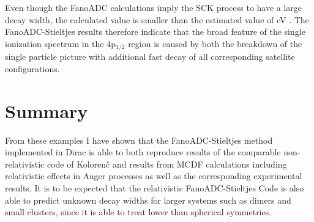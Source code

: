 Even though the FanoADC calculations imply the \ac{SCK} process to have
a large decay width, the calculated value is smaller than the estimated
value of \unit[10 -- 100]{eV} \cite{Heinaesmaeki04}.
The FanoADC-Stieltjes results therefore indicate that the broad
feature of the single ionization spectrum in the 4p$_{1/2}$ region is caused
by both the breakdown of the single particle picture with additional fast decay
of all corresponding satellite configurations.


\section{Summary}
From these examples I have shown that the FanoADC-Stieltjes method implemented
in Dirac is able to both reproduce results of the comparable non-relativistic
code of Koloren\v{c}  and results from \ac{MCDF} calculations
including relativistic effects in Auger processes as well as the corresponding
experimental results.
It is to be expected that the relativistic FanoADC-Stieltjes Code is also able
to predict unknown decay widths for larger systems such as dimers and small
clusters, since it is able to treat lower than spherical symmetries.
